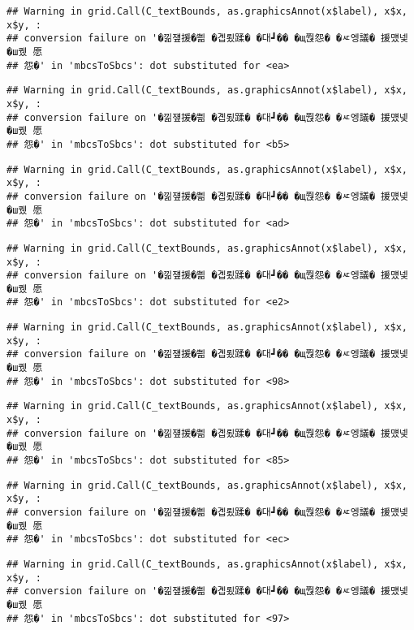 \documentclass[
]{article}
\begin{document}
\begin{verbatim}
## Warning in grid.Call(C_textBounds, as.graphicsAnnot(x$label), x$x, x$y, :
## conversion failure on '�낆쟾援�쁾 �곕룄蹂� �대┛�� �щ쭩怨� �ㅼ엥議� 援먰넻�ш퀬 愿
## 怨�' in 'mbcsToSbcs': dot substituted for <ea>
\end{verbatim}

\begin{verbatim}
## Warning in grid.Call(C_textBounds, as.graphicsAnnot(x$label), x$x, x$y, :
## conversion failure on '�낆쟾援�쁾 �곕룄蹂� �대┛�� �щ쭩怨� �ㅼ엥議� 援먰넻�ш퀬 愿
## 怨�' in 'mbcsToSbcs': dot substituted for <b5>
\end{verbatim}

\begin{verbatim}
## Warning in grid.Call(C_textBounds, as.graphicsAnnot(x$label), x$x, x$y, :
## conversion failure on '�낆쟾援�쁾 �곕룄蹂� �대┛�� �щ쭩怨� �ㅼ엥議� 援먰넻�ш퀬 愿
## 怨�' in 'mbcsToSbcs': dot substituted for <ad>
\end{verbatim}

\begin{verbatim}
## Warning in grid.Call(C_textBounds, as.graphicsAnnot(x$label), x$x, x$y, :
## conversion failure on '�낆쟾援�쁾 �곕룄蹂� �대┛�� �щ쭩怨� �ㅼ엥議� 援먰넻�ш퀬 愿
## 怨�' in 'mbcsToSbcs': dot substituted for <e2>
\end{verbatim}

\begin{verbatim}
## Warning in grid.Call(C_textBounds, as.graphicsAnnot(x$label), x$x, x$y, :
## conversion failure on '�낆쟾援�쁾 �곕룄蹂� �대┛�� �щ쭩怨� �ㅼ엥議� 援먰넻�ш퀬 愿
## 怨�' in 'mbcsToSbcs': dot substituted for <98>
\end{verbatim}

\begin{verbatim}
## Warning in grid.Call(C_textBounds, as.graphicsAnnot(x$label), x$x, x$y, :
## conversion failure on '�낆쟾援�쁾 �곕룄蹂� �대┛�� �щ쭩怨� �ㅼ엥議� 援먰넻�ш퀬 愿
## 怨�' in 'mbcsToSbcs': dot substituted for <85>
\end{verbatim}

\begin{verbatim}
## Warning in grid.Call(C_textBounds, as.graphicsAnnot(x$label), x$x, x$y, :
## conversion failure on '�낆쟾援�쁾 �곕룄蹂� �대┛�� �щ쭩怨� �ㅼ엥議� 援먰넻�ш퀬 愿
## 怨�' in 'mbcsToSbcs': dot substituted for <ec>
\end{verbatim}

\begin{verbatim}
## Warning in grid.Call(C_textBounds, as.graphicsAnnot(x$label), x$x, x$y, :
## conversion failure on '�낆쟾援�쁾 �곕룄蹂� �대┛�� �щ쭩怨� �ㅼ엥議� 援먰넻�ш퀬 愿
## 怨�' in 'mbcsToSbcs': dot substituted for <97>
\end{verbatim}
\end{document}
